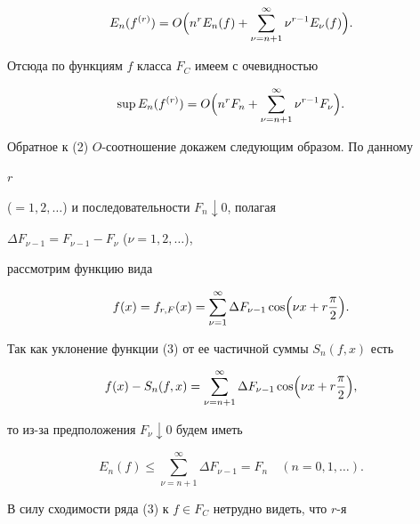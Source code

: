 \begin{equation}


E_n(f^{(r)})=O\Bigl(n^rE_n(f)+\sum^\infty_{\nu=n+1}\nu^{r-1}


E_\nu(f)\Bigr).


\end{equation}


Отсюда по функциям $f$ класса $F_C$ имеем с очевидностью


\begin{equation}


\sup E_n(f^{(r)})=O\Bigl(n^rF_n+\sum^\infty_{\nu=n+1}


\nu^{r-1}F_\nu \Bigr).


\end{equation}





Обратное к (2) $O$-соотношение докажем следующим образом. По данному


$r$


($=1,2,\dotsc$) и последовательности $F_n\downarrow 0$, полагая


$\Delta F_{\nu-1}=F_{\nu-1}-F_\nu$ ($\nu=1,2,\dotsc$),


рассмотрим функцию вида


\begin{equation}


f(x)=f_{r,F}(x)=\sum^\infty_{\nu=1}\Delta F_{\nu-1}\cos\Bigl(


\nu x+r\frac{\pi}{2}\Bigr).


\end{equation}


Так как уклонение функции (3) от ее частичной суммы $S_n(f,x)$ есть


$$


f(x)-S_n(f,x)=\sum^\infty_{\nu=n+1}\Delta F_{\nu-1}\cos\Bigl(


\nu x+r\frac{\pi}{2}\Bigr),


$$


то из-за предположения $F_\nu\downarrow 0$ будем иметь


\begin{equation}


E_n(f)\le\sum^\infty_{\nu=n+1}\Delta F_{\nu-1}=F_n\quad


(n=0,1,\dotsc).


\end{equation}


В силу сходимости ряда (3) к $f\in F_C$ нетрудно видеть, что $r$-я


